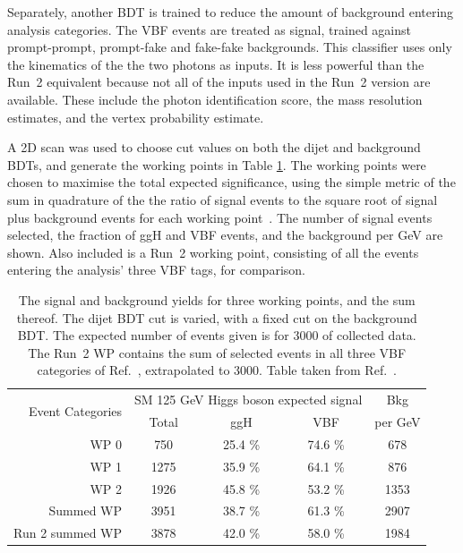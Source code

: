 Separately, another BDT is trained to reduce the amount of background entering analysis categories.
The VBF events are treated as signal, trained against prompt-prompt, 
prompt-fake and fake-fake \Hgg backgrounds.
This classifier uses only the kinematics of the the two photons as inputs. 
It is less powerful than the Run~2 equivalent 
because not all of the inputs used in the Run~2 version are available.
These include the photon identification score, 
the mass resolution estimates, and the vertex probability estimate.

A 2D scan was used to choose cut values on both the dijet and background BDTs, 
and generate the working points in Table \ref{tab:hgcal_yields}.
The working points were chosen to maximise the total expected significance, 
using the simple metric of the sum in quadrature of the 
the ratio of signal events to the square root of signal plus background events
for each working point~\cite{Asymptotic}.
The number of signal events selected, the fraction of ggH and VBF events, 
and the background per GeV are shown.
Also included is a Run~2 working point, 
consisting of all the events entering the analysis' three VBF tags, for comparison.

\begin{table}
  \centering
  \begin{tabular}{ r | c |  c |  c |  c }
  \multirow{2}{*}{Event Categories} &\multicolumn{3}{c|}{SM 125 GeV Higgs boson expected signal} & Bkg \\
    &  Total & ggH & VBF & per GeV \\
  \hline
  WP 0 &            750   &  25.4 \%  &  74.6 \%  &  678  \\
  WP 1 &            1275  &  35.9 \%  &  64.1 \%  &  876  \\
  WP 2 &            1926  &  45.8 \%  &  53.2 \%  &  1353 \\
  Summed WP &       3951  &  38.7 \%  &  61.3 \%  &  2907 \\
  Run 2 summed WP & 3878  &  42.0 \%  &  58.0 \%  &  1984 \\
  \end{tabular}
  \caption[Signal and background yields for a VBF \Hgg analysis with the upgraded CMS detector.]
  {
    The signal and background yields for three working points, and the sum thereof.
    The dijet BDT cut is varied, with a fixed cut on the background BDT.
    The expected number of events given is for \SI{3000}{\fbinv} of collected data. 
    The Run~2 WP contains the sum of selected events in all three VBF categories 
    of Ref.~\cite{HIG-16-040}, extrapolated to \SI{3000}{\fbinv}.
    Table taken from Ref.~\cite{HGCAL}.
  }
  \label{tab:hgcal_yields}
\end{table}

